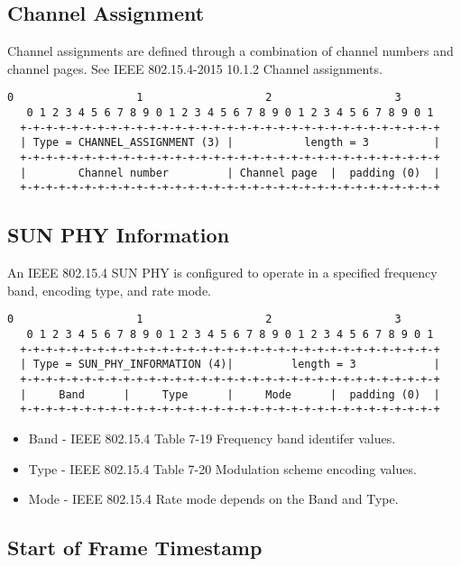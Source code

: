 \documentclass[12pt]{article}
\renewcommand\_{\textunderscore\allowbreak}
\begin{document}
\subsection{Channel Assignment}

Channel assignments are defined through a combination of channel numbers and
channel pages.  See IEEE 802.15.4-2015 10.1.2 Channel assignments.
\begin{Verbatim}[samepage=true]
   0                   1                   2                   3
   0 1 2 3 4 5 6 7 8 9 0 1 2 3 4 5 6 7 8 9 0 1 2 3 4 5 6 7 8 9 0 1
  +-+-+-+-+-+-+-+-+-+-+-+-+-+-+-+-+-+-+-+-+-+-+-+-+-+-+-+-+-+-+-+-+
  | Type = CHANNEL_ASSIGNMENT (3) |           length = 3          |
  +-+-+-+-+-+-+-+-+-+-+-+-+-+-+-+-+-+-+-+-+-+-+-+-+-+-+-+-+-+-+-+-+
  |        Channel number         | Channel page  |  padding (0)  |
  +-+-+-+-+-+-+-+-+-+-+-+-+-+-+-+-+-+-+-+-+-+-+-+-+-+-+-+-+-+-+-+-+
\end{Verbatim}

\subsection{SUN PHY Information}

An IEEE 802.15.4 SUN PHY is configured to operate in a specified frequency
band, encoding type, and rate mode.

\begin{Verbatim}[samepage=true]
   0                   1                   2                   3
   0 1 2 3 4 5 6 7 8 9 0 1 2 3 4 5 6 7 8 9 0 1 2 3 4 5 6 7 8 9 0 1
  +-+-+-+-+-+-+-+-+-+-+-+-+-+-+-+-+-+-+-+-+-+-+-+-+-+-+-+-+-+-+-+-+
  | Type = SUN_PHY_INFORMATION (4)|         length = 3            |
  +-+-+-+-+-+-+-+-+-+-+-+-+-+-+-+-+-+-+-+-+-+-+-+-+-+-+-+-+-+-+-+-+
  |     Band      |     Type      |     Mode      |  padding (0)  |
  +-+-+-+-+-+-+-+-+-+-+-+-+-+-+-+-+-+-+-+-+-+-+-+-+-+-+-+-+-+-+-+-+
\end{Verbatim}

\begin{itemize}
    \item Band - IEEE 802.15.4 Table 7-19 Frequency band identifer values.
    \item Type - IEEE 802.15.4 Table 7-20 Modulation scheme encoding values.
    \item Mode - IEEE 802.15.4 Rate mode depends on the Band and Type.
\end{itemize}

\newpage
\subsection{Start of Frame Timestamp}
\end{document}
